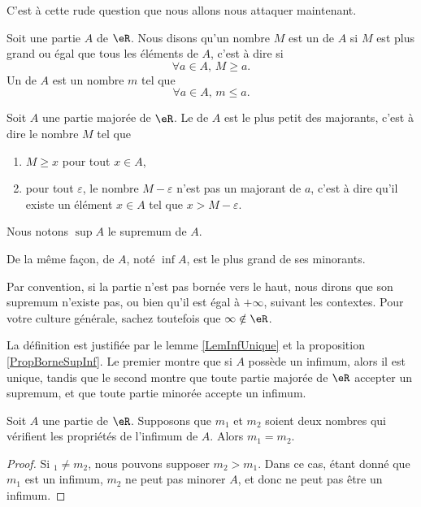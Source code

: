 C'est à cette rude question que nous allons nous attaquer maintenant.

\begin{definition}
Soit une partie $A$ de $\eR$. Nous disons qu'un nombre $M$ est un  de $A$ si $M$ est plus grand ou égal que tous les éléments de $A$, c'est à dire si
\begin{equation}
	\forall a\in A,\, M\geq a.
\end{equation}
Un  de $A$ est un nombre $m$ tel que 
\begin{equation}
	\forall a\in A,\, m\leq a.
\end{equation}
\end{definition}

\begin{definition}		\label{DefSupeA}
Soit $A$ une partie majorée de $\eR$. Le  de $A$ est le plus petit des majorants, c'est à dire le nombre $M$ tel que
\begin{enumerate}
	\item
		$M\geq x$ pour tout $x\in A$,
	\item
		pour tout $\varepsilon$, le nombre $M-\varepsilon$ n'est pas un majorant de $a$, c'est à dire qu'il existe un élément $x\in A$ tel que $x>M-\varepsilon$.
\end{enumerate}
Nous notons $\sup A$ le supremum de $A$.

De la même façon,  de $A$, noté $\inf A$, est le plus grand de ses minorants. 
\end{definition}
Par convention, si la partie n'est pas bornée vers le haut, nous dirons que son supremum n'existe pas, ou bien qu'il est égal à $+\infty$, suivant les contextes. Pour votre culture générale, sachez toutefois que $\infty\notin\eR$.

La définition est justifiée par le lemme \ref{LemInfUnique} et la proposition \ref{PropBorneSupInf}. Le premier montre que si $A$ possède un infimum, alors il est unique, tandis que le second montre que toute partie majorée de $\eR$ accepter un supremum, et que toute partie minorée accepte un infimum.
\begin{lemma}		\label{LemInfUnique}
	Soit $A$ une partie de $\eR$. Supposons que $m_1$ et $m_2$ soient deux nombres qui vérifient les propriétés de l'infimum de $A$. Alors $m_1=m_2$.
\end{lemma}

\begin{proof}
	Si $_1\neq m_2$, nous pouvons supposer $m_2>m_1$. Dans ce cas, étant donné que $m_1$ est un infimum, $m_2$ ne peut pas minorer $A$, et donc ne peut pas être un infimum.
\end{proof}

